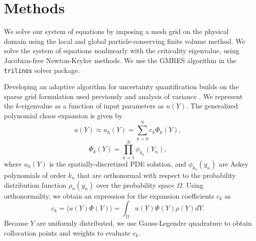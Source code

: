 \documentclass{anstrans} \usepackage{amsmath} \usepackage{amssymb}
\begin{document}
\section{Methods}
We solve our system of equations by imposing a mesh grid on the physical domain using the local and global
particle-conserving finite volume method.  We solve the system of equations nonlinearly with the criticality
eigenvalue, using Jacobian-free Newton-Krylov methods.  We use the GMRES algorithm in the \texttt{trilinos}
solver package.%

Developing an adaptive algorithm for uncertainty quantification builds on the sparse grid formulation used 
previously \cite{ans2014} and
analysis of variance \cite{Ayres}.  We represent the $k$-eigenvalue as a function of input parameters as
$u(Y)$.  The generalized polynomial chaos expansion is given by
\begin{equation}\label{approx}
  u(Y)\approx u_{h}(Y)=\sum_{k=0}^\eta c_k\Phi_k(Y),
\end{equation} 
\begin{equation} 
  \Phi_k(Y)=\prod_{n=1}^N \phi_{k_n}(Y_n), 
\end{equation} 
where $u_h(Y)$ is the
spatially-discretized PDE solution, and $\phi_{k_n}(y_n)$ are Askey polynomials of order $k_n$ that are
orthonormal with respect to the probability distribution function $\rho_n(y_n)$ over the probability space
$\Omega$.
Using orthonormality, we obtain an expression for the expansion coefficients $c_k$ as
\begin{equation}
  c_k = \langle u(Y)\Phi(Y)\rangle = \int_\Omega u(Y)\Phi(Y)\rho(Y) dY.
\end{equation}
Because $Y$ are uniformly distributed, we use Gauss-Legendre quadrature to obtain
collocation points and weights to evaluate $c_k$.  %
\end{document}

